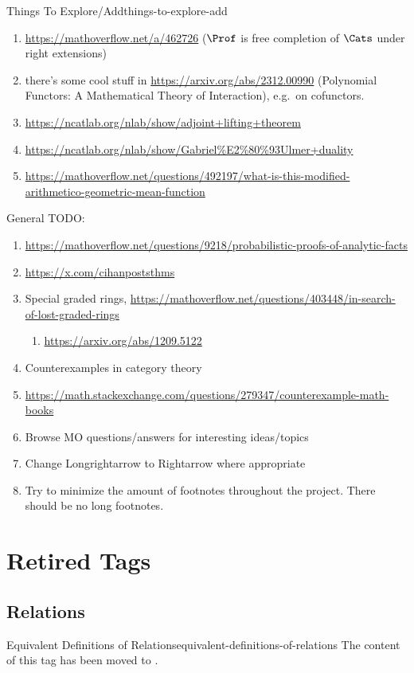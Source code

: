 \begin{remark}{Things To Explore/Add}{things-to-explore-add}
\begin{enumerate}
        \item \url{https://mathoverflow.net/a/462726} ($\Prof$ is free completion of $\Cats$ under right extensions)
        \item there's some cool stuff in \url{https://arxiv.org/abs/2312.00990} (Polynomial Functors: A Mathematical Theory of Interaction), e.g.\ on cofunctors.
        \item \url{https://ncatlab.org/nlab/show/adjoint+lifting+theorem}
        \item \url{https://ncatlab.org/nlab/show/Gabriel\%E2\%80\%93Ulmer+duality}
        \item \url{https://mathoverflow.net/questions/492197/what-is-this-modified-arithmetico-geometric-mean-function}
    \end{enumerate}
    General TODO:
    \begin{enumerate}
        \item \url{https://mathoverflow.net/questions/9218/probabilistic-proofs-of-analytic-facts}
        \item \url{https://x.com/cihanpoststhms}
        \item Special graded rings, \url{https://mathoverflow.net/questions/403448/in-search-of-lost-graded-rings}
            \begin{enumerate}
                \item \url{https://arxiv.org/abs/1209.5122}
            \end{enumerate}
        \item Counterexamples in category theory
        \item \url{https://math.stackexchange.com/questions/279347/counterexample-math-books}
        \item Browse MO questions/answers for interesting ideas/topics
        \item Change Longrightarrow to Rightarrow where appropriate
        \item Try to minimize the amount of footnotes throughout the project. There should be no long footnotes.
    \end{enumerate}
\end{remark}
\section{Retired Tags}\label{section-retired-tags}
\subsection{Relations}\label{subsection-retired-tags-relations}
\begin{oldtag}{Equivalent Definitions of Relations}{equivalent-definitions-of-relations}%
    The content of this tag has been moved to .
\end{oldtag}
